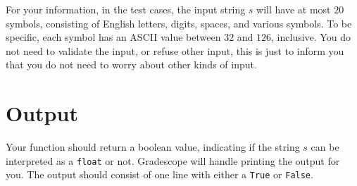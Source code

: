 For your information, in the test cases,
the input string $s$ will have at most $20$ symbols,
consisting of English letters, digits, spaces, and various symbols.
To be specific, each symbol has an ASCII value between $32$ and $126$, inclusive.
You do not need to validate the input, or refuse other input,
this is just to inform you that you do not need to worry about other kinds of input.

\section*{Output}

Your function should return a boolean value,
indicating if the string $s$ can be interpreted as a \texttt{float} or not.
Gradescope will handle printing the output for you.
The output should consist of one line with either a \texttt{True} or \texttt{False}.
